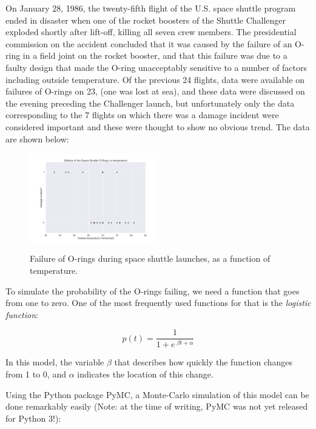 On January 28, 1986, the twenty-fifth flight of the U.S. space shuttle program ended in disaster when one of the rocket boosters of the Shuttle Challenger exploded shortly after lift-off, killing all seven crew members. The presidential commission on the accident concluded that it was caused by the failure of an O-ring in a field joint on the rocket booster, and that this failure was due to a faulty design that made the O-ring unacceptably sensitive to a number of factors including outside temperature. Of the previous 24 flights, data were available on failures of O-rings on 23, (one was lost at sea), and these data were discussed on the evening preceding the Challenger launch, but unfortunately only the data corresponding to the 7 flights on which there was a damage incident were considered important and these were thought to show no obvious trend. The data are shown below:

\begin{figure}[H]
  \centering
  \includegraphics[width=0.5\textwidth]{../Images/Challenger_ORings.png}\\
  \caption{Failure of O-rings during space shuttle launches, as a function of temperature.}
\end{figure}

To simulate the probability of the O-rings failing, we need a function that goes from one to zero. One of the most frequently used functions for that is the \emph{logistic function}:

\begin{equation}\label{eq:logisticFcn}
  p(t) = \frac{1}{ 1 + e^{ \;\beta t + \alpha } }
\end{equation}

In this model, the variable $\beta$ that describes how quickly the function changes from 1 to 0, and $\alpha$ indicates the location of this change.

Using the Python package PyMC, a Monte-Carlo simulation of this model can be done remarkably easily (Note: at the time of writing, PyMC was not yet released for Python 3!):

